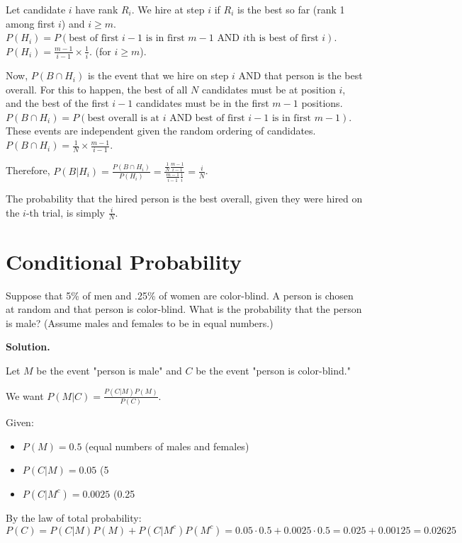 Let candidate $i$ have rank $R_i$. We hire at step $i$ if $R_i$ is the best so far (rank 1 among first $i$) and $i \ge m$.
$P(H_i) = P(\text{best of first } i-1 \text{ is in first } m-1 \text{ AND } i\text{th is best of first }i)$.
$P(H_i) = \frac{m-1}{i-1} \times \frac{1}{i}$. (for $i \ge m$).

Now, $P(B \cap H_i)$ is the event that we hire on step $i$ AND that person is the best overall.
For this to happen, the best of all $N$ candidates must be at position $i$, and the best of the first $i-1$ candidates must be in the first $m-1$ positions.
$P(B \cap H_i) = P(\text{best overall is at } i \text{ AND best of first } i-1 \text{ is in first } m-1)$.
These events are independent given the random ordering of candidates.
$P(B \cap H_i) = \frac{1}{N} \times \frac{m-1}{i-1}$.

Therefore, $P(B|H_i) = \frac{P(B \cap H_i)}{P(H_i)} = \frac{\frac{1}{N} \frac{m-1}{i-1}}{\frac{m-1}{i-1} \frac{1}{i}} = \frac{i}{N}$.

The probability that the hired person is the best overall, given they were hired on the $i$-th trial, is simply $\frac{i}{N}$.

\section{Conditional Probability}

\begin{problembox}
Suppose that 5\% of men and .25\% of women are color-blind. A person is chosen at random and that person is color-blind. What is the probability that the person is male? (Assume males and females to be in equal numbers.)
\end{problembox}

\noindent\textbf{Solution.}

Let $M$ be the event "person is male" and $C$ be the event "person is color-blind."

We want $P(M|C) = \frac{P(C|M)P(M)}{P(C)}$.

Given:
\begin{itemize}
\item $P(M) = 0.5$ (equal numbers of males and females)
\item $P(C|M) = 0.05$ (5%
\item $P(C|M^c) = 0.0025$ (0.25%
\end{itemize}

By the law of total probability:
$P(C) = P(C|M)P(M) + P(C|M^c)P(M^c) = 0.05 \cdot 0.5 + 0.0025 \cdot 0.5 = 0.025 + 0.00125 = 0.02625$

